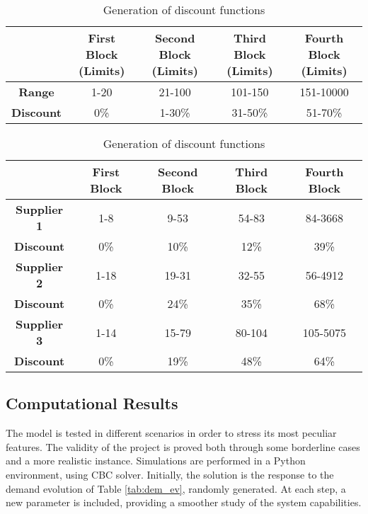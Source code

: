 \documentclass{article}
\begin{document}
\begin{table}[H]
    \centering
    \begin{subtable}[c]{\textwidth}
        \centering
    \begin{tabular}{|c|c|c|c|c|}
    \hline
    & \makecell{\textbf{First Block}\\\textbf{(Limits)}}  & \makecell{\textbf{Second Block}\\\textbf{(Limits)}} & \makecell{\textbf{Third Block}\\\textbf{(Limits)}} & \makecell{\textbf{Fourth Block}\\\textbf{(Limits)}}\\
    \hline
    \textbf{Range} & 1-20 & 21-100 & 101-150 & 151-10000 \\
    \hline
    \textbf{Discount} & 0\% & 1-30\% & 31-50\% & 51-70\% \\
    \hline
    \end{tabular}
    \caption{Discount boundaries}
    \label{subtab:limits}
    \vspace{5mm}
    \end{subtable}

    \begin{subtable}[c]{\textwidth}
        \centering
    \begin{tabular}{|c|c|c|c|c|}
    \hline
    & \textbf{First Block} & \textbf{Second Block} & \textbf{Third Block} & \textbf{Fourth Block}\\
    \hline
    \textbf{Supplier 1} & 1-8 & 9-53 & 54-83 & 84-3668 \\
    \textbf{Discount} & 0\% & 10\% & 12\% & 39\% \\
    \hline
    \textbf{Supplier 2} & 1-18 & 19-31 & 32-55 & 56-4912 \\
    \textbf{Discount} & 0\% & 24\% & 35\% & 68\% \\
    \hline
    \textbf{Supplier 3} & 1-14 & 15-79 & 80-104 & 105-5075 \\
    \textbf{Discount} & 0\% & 19\% & 48\% & 64\% \\
    \hline
    \end{tabular}
    \caption{Suppliers discounts}
    \label{subtab: supplier_discounts}
    \end{subtable}
    \caption{Generation of discount functions }
    \label{tab:discounts}
\end{table}
\subsection{Computational Results}\label{subsec:computational_results_exact}
The model is tested in different scenarios in order to stress its most peculiar features. The validity of the project is proved both through some borderline cases and a more realistic instance. Simulations are performed in a Python environment, using CBC solver.  \newline
Initially, the solution is the response to the demand evolution of Table \ref{tab:dem_ev}, randomly generated. At each step, a new parameter is included, providing a smoother study of the system capabilities.
\newline
\end{document}
